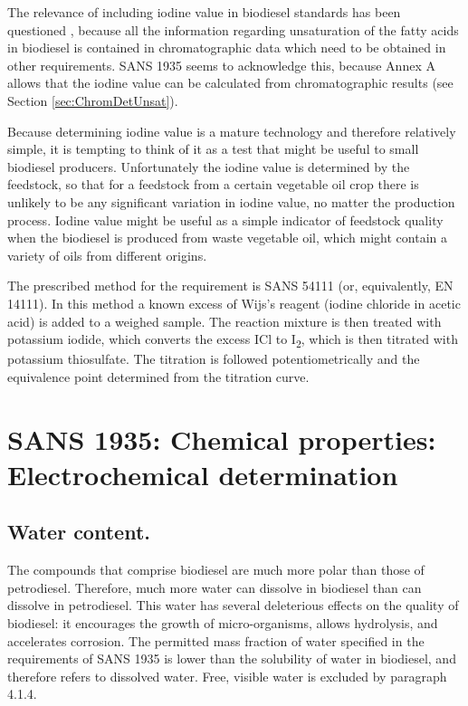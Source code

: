 The relevance of including iodine value in biodiesel standards has been
questioned \autocite{Knothe2002}, because all the information regarding
unsaturation of the fatty acids in biodiesel is contained in chromatographic
data which need to be obtained in other requirements. SANS 1935 seems to
acknowledge this, because Annex A allows that the iodine value can be calculated
from chromatographic results (see Section \ref{sec:ChromDetUnsat}).

Because determining iodine value is a mature technology and therefore relatively
simple, it is tempting to think of it as a test that might be useful to small
biodiesel producers. Unfortunately the iodine value is determined by the
feedstock, so that for a feedstock from a certain vegetable oil crop there is
unlikely to be any significant variation in iodine value, no matter the
production process. Iodine value might be useful as a simple indicator of
feedstock quality when the biodiesel is produced from waste vegetable oil, which
might contain a variety of oils from different origins.

The prescribed method for the requirement is SANS 54111 (or, equivalently, EN
14111). In this method a known excess of Wijs's reagent (iodine chloride in
acetic acid) is added to a weighed sample. The reaction mixture is then treated
with potassium iodide, which converts the excess ICl to I\textsubscript{2},
which is then titrated with potassium thiosulfate. The titration is followed
potentiometrically and the equivalence point determined from the titration
curve.

\section{SANS 1935: Chemical properties: Electrochemical determination}

\subsection{Water content.}

The compounds that comprise biodiesel are much more polar than those of
petro\-diesel. Therefore, much more water can dissolve in biodiesel than can
dissolve in petrodiesel. This water has several deleterious effects on the
quality of biodiesel: it encourages the growth of micro-organisms, allows
hydrolysis, and accelerates corrosion. The permitted mass fraction of water
specified in the requirements of SANS 1935 is lower than the solubility of water
in biodiesel, and therefore refers to dissolved water. Free, visible water is
excluded by paragraph 4.1.4.

